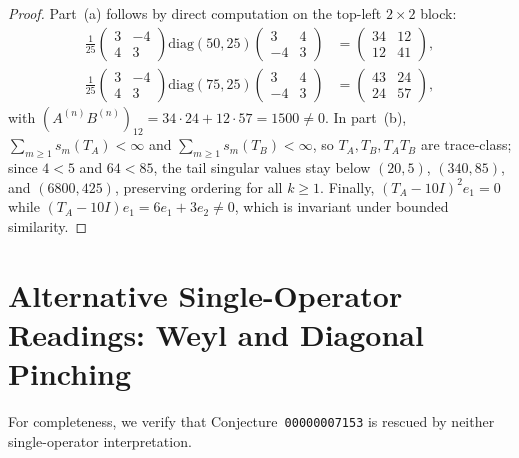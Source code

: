 \documentclass[11pt,a4paper]{article}
\theoremstyle{definition}
\newcommand{\diag}{\mathrm{diag}}
\begin{document}
\begin{proof}
Part~(a) follows by direct computation on the top-left $2\times 2$ block:
\[
\begin{aligned}
  \frac{1}{25}\begin{pmatrix} 3 & -4 \\ 4 & 3 \end{pmatrix}\diag(50, 25)\begin{pmatrix} 3 & 4 \\ -4 & 3 \end{pmatrix} &= \begin{pmatrix} 34 & 12 \\ 12 & 41 \end{pmatrix}, \\
  \frac{1}{25}\begin{pmatrix} 3 & -4 \\ 4 & 3 \end{pmatrix}\diag(75, 25)\begin{pmatrix} 3 & 4 \\ -4 & 3 \end{pmatrix} &= \begin{pmatrix} 43 & 24 \\ 24 & 57 \end{pmatrix},
\end{aligned}
\]
with $(A^{(n)}B^{(n)})_{12} = 34\cdot 24 + 12\cdot 57 = 1500 \ne 0$. In part~(b), $\sum_{m\ge 1} s_m(T_A) < \infty$ and $\sum_{m\ge 1} s_m(T_B) < \infty$, so $T_A, T_B, T_A T_B$ are trace-class; since $4 < 5$ and $64 < 85$, the tail singular values stay below $(20, 5)$, $(340, 85)$, and $(6800, 425)$, preserving ordering for all $k \ge 1$. Finally, $(T_A - 10 I)^2 e_1 = 0$ while $(T_A - 10 I)e_1 = 6 e_1 + 3 e_2 \ne 0$, which is invariant under bounded similarity.
\end{proof}

\section{Alternative Single-Operator Readings: Weyl and Diagonal Pinching}

For completeness, we verify that Conjecture~\texttt{00000007153} is rescued by neither single-operator interpretation.
\end{document}
